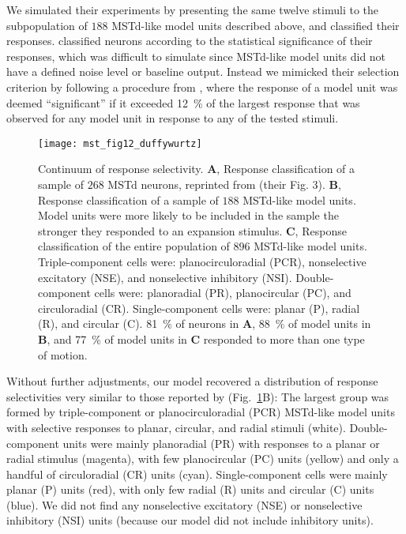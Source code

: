 We simulated their experiments by presenting the same twelve stimuli to 
the subpopulation of $188$ \ac{MSTd}-like model units described above, and
classified their responses. \cite{DuffyWurtz1995} classified neurons 
according to the statistical significance of their responses, which was 
difficult to simulate since \ac{MSTd}-like model units did not have a 
defined noise level or baseline output. Instead we mimicked their selection
criterion by following a procedure from \cite{PerroneStone1998}, where the
response of a model unit was deemed ``significant'' if it exceeded 
\SI{12}{\percent} of the largest response that was observed for any model
unit in response to any of the tested stimuli.

\begin{figure}[t]
  \centering
  \texttt{[image: mst\_fig12\_duffywurtz]}
  \caption{
  Continuum of response selectivity. 
  \textbf{A}, Response classification of a sample of $268$ \ac{MSTd} neurons,
  reprinted from \cite{DuffyWurtz1995} (their Fig. 3). 
  \textbf{B}, Response classification of a sample of $188$ \ac{MSTd}-like
  model units. Model units were more likely to be included in the sample 
  the stronger they responded to an expansion stimulus. 
  \textbf{C}, Response classification of the entire population of $896$
  \ac{MSTd}-like model units. Triple-component cells were: planocirculoradial
  (PCR), nonselective excitatory (NSE), and nonselective inhibitory (NSI).
  Double-component cells were: planoradial (PR), planocircular (PC), and
  circuloradial (CR). Single-component cells were: planar (P), radial (R),
  and circular (C). \SI{81}{\percent} of neurons in \textbf{A}, 
  \SI{88}{\percent} of model units in \textbf{B}, and \SI{77}{\percent} of
  model units in \textbf{C} responded to more than one type of motion.}
  \label{fig:MSTd|duffywurtz}
\end{figure}

Without further adjustments, our model recovered a distribution of response
selectivities very similar to those reported by \cite{DuffyWurtz1995}
(Fig.~\ref{fig:MSTd|duffywurtz}B): The largest group was formed by 
triple-component or planocirculoradial (PCR) \ac{MSTd}-like model units with
selective responses to planar, circular, and radial stimuli (white). 
Double-component units were mainly planoradial (PR) with responses to a 
planar or radial stimulus (magenta), with few planocircular (PC) units 
(yellow) and only a handful of circuloradial (CR) units (cyan). 
Single-component cells were mainly planar (P) units (red), with only few 
radial (R) units and circular (C) units (blue). We did not find any 
nonselective excitatory (NSE) or nonselective inhibitory (NSI) units 
(because our model did not include inhibitory units).

